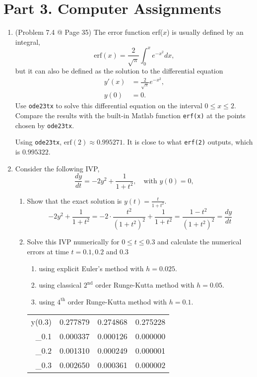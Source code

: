 \documentclass[10pt]{report}
\newcommand{\dintt}[4] {\int_{#1}^{#2} #3 d#4}
\begin{document}
\section*{Part 3. Computer Assignments}
\begin{enumerate}
	\item 
	(Problem 7.4 @ Page 35) The error function erf($x$) is usually defined by an integral,
	\[
	\text{erf}(x) = \frac{2}{\sqrt{\pi}} \dintt{0}{x}{e^{-x^2}}{x},
	\]
	but it can also be defined as the solution to the differential equation
	\begin{align*}
		y'(x) &= \frac{2}{\sqrt{\pi}}e^{-x^2},\\
		y(0) &= 0.
	\end{align*}
	Use \texttt{ode23tx} to solve this differential equation on the interval $0 \le x \le 2$. Compare the results with the built-in Matlab function \texttt{erf(x)} at the points chosen by \texttt{ode23tx}.
	
	
	Using \texttt{ode23tx}, $\text{erf}(2) \approx 0.995271$. It is close to what \texttt{erf(2)} outputs, which is $0.995322$.
	
	\item 
	Consider the following IVP,
	\[
	\frac{dy}{dt} = -2y^2 + \frac{1}{1+t^2},\quad \text{with } y(0) = 0,
	\]
	\begin{enumerate}
		\item 
		Show that the exact solution is $y(t) = \frac{t}{1+t^2}$.
		\[
		-2y^2 + \frac{1}{1+t^2} = -2\cdot\frac{t^2}{(1+t^2)^2} + \frac{1}{1+t^2} = \frac{1 - t^2}{(1+t^2)^2} = \frac{dy}{dt}
		\]
		
		\item 
		Solve this IVP numerically for $0 \le t \le 0.3$ and calculate the numerical errors at time $t=0.1, 0.2$ and $0.3$
		\begin{enumerate}
			\item 
			using explicit Euler’s method with $h=0.025$.
			
			\item 
			using classical $2^{\text{nd}}$ order Runge-Kutta method with $h=0.05$.
			
			\item 
			using $4^{\text{th}}$ order Runge-Kutta method with $h=0.1$.
		\end{enumerate}
	
		
		\begin{table}[H]
			\centering
			\begin{tabular}{*{4}{N}} 
				\toprule
				 &  &  &  \\ \midrule
				y(0.3) & 0.277879 & 0.274868 & 0.275228 \\
				\epsilon_{0.1} & 0.000337 & 0.000126 & 0.000000 \\
				\epsilon_{0.2} & 0.001310 & 0.000249 & 0.000001 \\
				\epsilon_{0.3} & 0.002650 & 0.000361 & 0.000002 \\
				\bottomrule
			\end{tabular}
		\end{table}
	\end{enumerate}
	

\end{enumerate}
\end{document}
